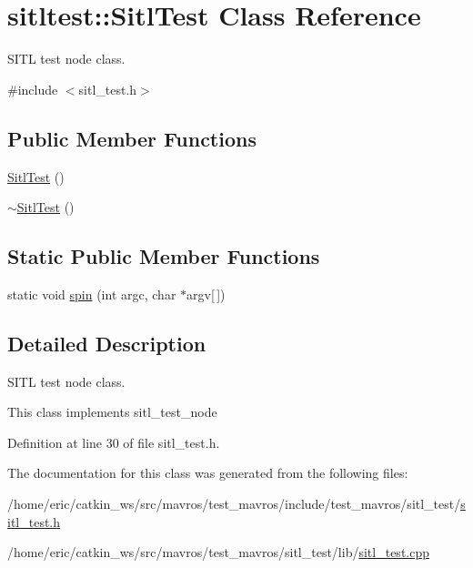 \hypertarget{classsitltest_1_1SitlTest}{}\section{sitltest\+::Sitl\+Test Class Reference}
\label{classsitltest_1_1SitlTest}


S\+I\+TL test node class.  




{\ttfamily \#include $<$sitl\+\_\+test.\+h$>$}

\subsection*{Public Member Functions}
\begin{DoxyCompactItemize}
\item 
\mbox{\hyperlink{group__sitl__test_ga4e6f992c799d276e008e38fb25ee6a8d}{Sitl\+Test}} ()
\item 
\mbox{\hyperlink{group__sitl__test_gae851257616c8079c36a14c48c49f1f9b}{$\sim$\+Sitl\+Test}} ()
\end{DoxyCompactItemize}
\subsection*{Static Public Member Functions}
\begin{DoxyCompactItemize}
\item 
static void \mbox{\hyperlink{group__sitl__test_ga02981fb9641a69a1f577a72c30f3a857}{spin}} (int argc, char $\ast$argv\mbox{[}$\,$\mbox{]})
\end{DoxyCompactItemize}


\subsection{Detailed Description}
S\+I\+TL test node class. 

This class implements sitl\+\_\+test\+\_\+node 

Definition at line 30 of file sitl\+\_\+test.\+h.



The documentation for this class was generated from the following files\+:\begin{DoxyCompactItemize}
\item 
/home/eric/catkin\+\_\+ws/src/mavros/test\+\_\+mavros/include/test\+\_\+mavros/sitl\+\_\+test/\mbox{\hyperlink{sitl__test_8h}{sitl\+\_\+test.\+h}}\item 
/home/eric/catkin\+\_\+ws/src/mavros/test\+\_\+mavros/sitl\+\_\+test/lib/\mbox{\hyperlink{sitl__test_8cpp}{sitl\+\_\+test.\+cpp}}\end{DoxyCompactItemize}
